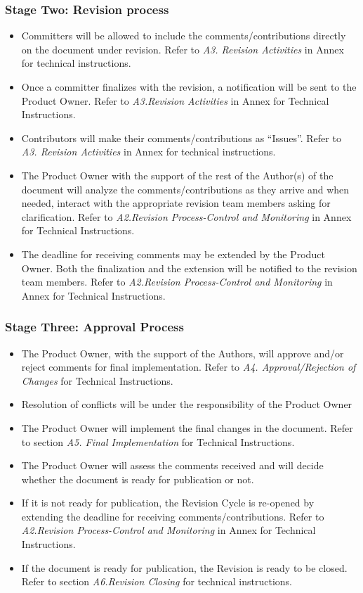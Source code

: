 \documentclass{template/openetcs_article}
\begin{document}
\subsubsection{Stage Two: Revision process}
\begin{itemize}
\item Committers will be allowed to include the comments/contributions directly on the document under revision. Refer to {\it A3. Revision Activities} in Annex for technical instructions.
\item Once a committer finalizes with the revision, a notification will be sent to the Product Owner. Refer to {\it A3.Revision Activities} in Annex for Technical Instructions.
\item Contributors will make their comments/contributions as “Issues”. Refer to {\it A3. Revision Activities} in Annex for technical instructions.
\item The Product Owner with the support of the rest of the Author(s) of the document will analyze the comments/contributions as they arrive and when needed, interact with the appropriate revision team members asking for clarification. Refer to {\it A2.Revision Process-Control and Monitoring} in Annex for Technical Instructions.
\item The deadline for receiving comments may be extended by the Product Owner. Both the finalization and the extension will be notified to the revision team members. Refer to {\it A2.Revision Process-Control and Monitoring} in Annex for Technical Instructions.
\end{itemize}

\subsubsection{Stage Three: Approval Process}
\begin{itemize}
\item The Product Owner, with the support of the Authors, will approve and/or reject comments for final implementation. Refer to {\it A4. Approval/Rejection of Changes} for Technical Instructions.
\item Resolution of conflicts will be under the responsibility of the Product Owner
\item The Product Owner will implement the final changes in the document. Refer to section {\it A5. Final Implementation} for Technical Instructions.
\item The Product Owner will assess the comments received and will decide whether the document is ready for publication or not.
\item If it is not ready for publication, the Revision Cycle is re-opened by extending the deadline for receiving comments/contributions. Refer to {\it A2.Revision Process-Control and Monitoring} in Annex for Technical Instructions.
\item If the document is ready for publication, the Revision is ready to be closed. Refer to section {\it A6.Revision Closing} for technical instructions.
\end{itemize}
\end{document}
